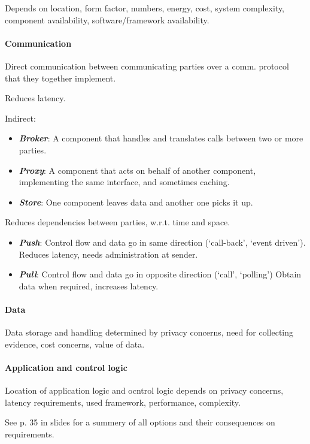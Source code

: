 \documentclass[11pt]{article}
\let\oldemph\emph
\renewcommand{\emph}[1]{\oldemph{\textbf{#1}}\marginpar{\textbf{#1}}}
\begin{document}
    Depends on location, form factor, numbers, energy, cost, system complexity, component availability, software/framework availability.


    \paragraph{Communication}
    Direct communication between communicating parties over a comm. protocol that they together implement.

    Reduces latency.

    Indirect:
    \begin{itemize}
        \item \emph{Broker}: A component that handles and translates calls between two or more parties.
        \item \emph{Proxy}: A component that acts on behalf of another component, implementing the same interface, and sometimes caching.
        \item \emph{Store}: One component leaves data and another one picks it up.
    \end{itemize}
    Reduces dependencies between parties, w.r.t. time and space.

    \begin{itemize}
        \item \emph{Push}: Control flow and data go in same direction (`call-back', `event driven').
        Reduces latency, needs administration at sender.
        \item \emph{Pull}: Control flow and data go in opposite direction (`call', `polling')
        Obtain data when required, increases latency.
    \end{itemize}

    \paragraph{Data}
    Data storage and handling determined by privacy concerns, need for collecting evidence, cost concerns, value of data.

    \paragraph{Application and control logic}
    Location of application logic and ocntrol logic depends on privacy concerns, latency requirements, used framework, performance, complexity.

    See p. 35 in slides for a summery of all options and their consequences on requirements.
\end{document}

